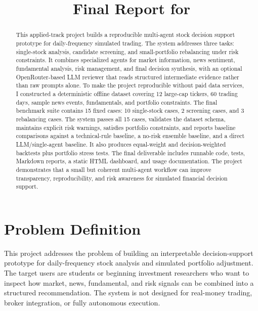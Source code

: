 \documentclass{article}
\title{\reporttitle\\
\large Final Report for \coursename{}}
\author{\reportauthors}
\begin{document}
\maketitle

\begin{abstract}
This applied-track project builds a reproducible multi-agent stock decision support prototype for daily-frequency simulated trading. The system addresses three tasks: single-stock analysis, candidate screening, and small-portfolio rebalancing under risk constraints. It combines specialized agents for market information, news sentiment, fundamental analysis, risk management, and final decision synthesis, with an optional OpenRouter-based LLM reviewer that reads structured intermediate evidence rather than raw prompts alone. To make the project reproducible without paid data services, I constructed a deterministic offline dataset covering 12 large-cap tickers, 60 trading days, sample news events, fundamentals, and portfolio constraints. The final benchmark suite contains 15 fixed cases: 10 single-stock cases, 2 screening cases, and 3 rebalancing cases. The system passes all 15 cases, validates the dataset schema, maintains explicit risk warnings, satisfies portfolio constraints, and reports baseline comparisons against a technical-rule baseline, a no-risk ensemble baseline, and a direct LLM/single-agent baseline. It also produces equal-weight and decision-weighted backtests plus portfolio stress tests. The final deliverable includes runnable code, tests, Markdown reports, a static HTML dashboard, and usage documentation. The project demonstrates that a small but coherent multi-agent workflow can improve transparency, reproducibility, and risk awareness for simulated financial decision support.
\end{abstract}

\section{Problem Definition}
\label{sec:problem-def}

This project addresses the problem of building an interpretable decision-support prototype for daily-frequency stock analysis and simulated portfolio adjustment. The target users are students or beginning investment researchers who want to inspect how market, news, fundamental, and risk signals can be combined into a structured recommendation. The system is not designed for real-money trading, broker integration, or fully autonomous execution.
\end{document}
